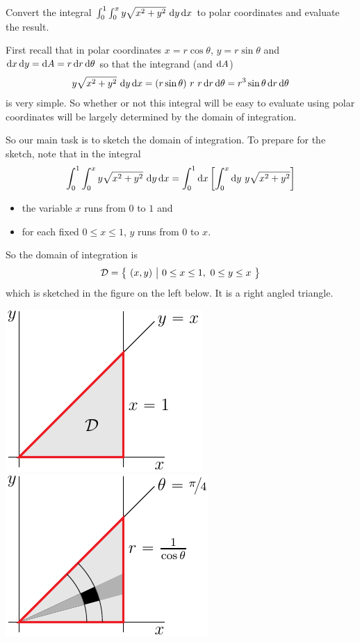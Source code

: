 \begin{eg}\label{eg change to polar}
Convert the integral $\int_0^1\int_0^x y\sqrt{x^2+y^2}\ \mathrm{d}y\,\mathrm{d}x$ 
to polar coordinates and evaluate the result.

\soln
First recall that in polar coordinates $x=r\cos\theta$, $y=r\sin\theta$
and $\mathrm{d}x\,\mathrm{d}y=\mathrm{d}A=r\,\mathrm{d}r\,\mathrm{d}\theta$ so that the 
integrand (and $\mathrm{d}A$)
\begin{align*}
y\sqrt{x^2+y^2}\ \mathrm{d}y\,\mathrm{d}x
=(r\sin\theta)\ r\ r\, \mathrm{d}r\,\mathrm{d}\theta
=r^3\sin\theta\,\mathrm{d}r\,\mathrm{d}\theta
\end{align*}
is very simple. So whether or not this integral will be easy to evaluate
using polar coordinates will be largely determined by the domain 
of integration.

So our main task is to sketch the domain of integration. 
To prepare for the sketch, note that in the integral
\begin{equation*}
\int_0^1\int_0^x y\sqrt{x^2+y^2}\ \dee{y}\,\dee{x}
=\int_0^1\dee{x}  \left[\int_0^x \dee{y}\ y\sqrt{x^2+y^2}\right]
\end{equation*}
\begin{itemize}
\item 
the variable $x$ runs from $0$ to $1$ and
\item
for each fixed $0\le x\le 1$, $y$ runs from $0$ to $x$.
\end{itemize}
So the domain of integration is 
\begin{equation*}
\mathcal{D}=\big\{ \ (x,y)\ \big|\ 0\le x\le 1,\ 0\le y\le x\ \big\}
\end{equation*}
which is sketched in the figure on the left below.
It is a right angled triangle.
\begin{efig}
\begin{center}
    \includegraphics{convPolarA.pdf}\qquad
    \includegraphics{convPolarC.pdf}

\end{center}
\end{efig}
\end{eg}
